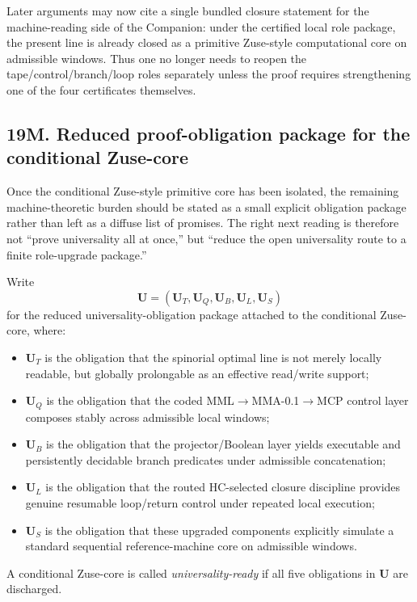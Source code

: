 \begin{corollary}
Later arguments may now cite a single bundled closure statement for the machine-reading side of the Companion: under the certified local role package, the present line is already closed as a primitive Zuse-style computational core on admissible windows. Thus one no longer needs to reopen the tape/control/branch/loop roles separately unless the proof requires strengthening one of the four certificates themselves.
\end{corollary}


\subsection*{19M. Reduced proof-obligation package for the conditional Zuse-core}
Once the conditional Zuse-style primitive core has been isolated, the remaining machine-theoretic burden should be stated as a small explicit obligation package rather than left as a diffuse list of promises. The right next reading is therefore not ``prove universality all at once,'' but ``reduce the open universality route to a finite role-upgrade package.''

\begin{definition}
Write
\[
\mathbf U=(\mathbf U_T,\mathbf U_Q,\mathbf U_B,\mathbf U_L,\mathbf U_S)
\]
for the reduced universality-obligation package attached to the conditional Zuse-core, where:
\begin{itemize}[leftmargin=2em]
  \item $\mathbf U_T$ is the obligation that the spinorial optimal line is not merely locally readable, but globally prolongable as an effective read/write support;
  \item $\mathbf U_Q$ is the obligation that the coded MML$\to$MMA-0.1$\to$MCP control layer composes stably across admissible local windows;
  \item $\mathbf U_B$ is the obligation that the projector/Boolean layer yields executable and persistently decidable branch predicates under admissible concatenation;
  \item $\mathbf U_L$ is the obligation that the routed HC-selected closure discipline provides genuine resumable loop/return control under repeated local execution;
  \item $\mathbf U_S$ is the obligation that these upgraded components explicitly simulate a standard sequential reference-machine core on admissible windows.
\end{itemize}
A conditional Zuse-core is called \emph{universality-ready} if all five obligations in $\mathbf U$ are discharged.
\end{definition}

